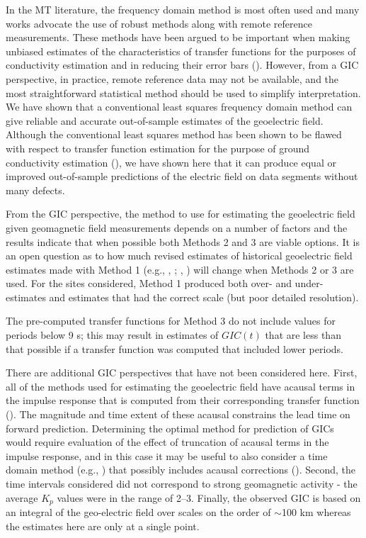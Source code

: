 \documentclass[linenumbers,draft]{agujournal}
\newcommand{\citeay}[1]{%
\citeauthor{#1}, \citeyear{#1}%
}
\begin{document}
In the MT literature, the frequency domain method is most often used and many works advocate the use of robust methods along with remote reference measurements.  These methods have been argued to be important when making unbiased estimates of the characteristics of transfer functions for the purposes of conductivity estimation and in reducing their error bars (\cite{Chave2012}).  However, from a GIC perspective, in practice, remote reference data may not be available, and the most straightforward statistical method should be used to simplify interpretation.  We have shown that a conventional least squares frequency domain method can give reliable and accurate out-of-sample estimates of the geoelectric field.  Although the conventional least squares method has been shown to be flawed with respect to transfer function estimation for the purpose of ground conductivity estimation (\cite{Egbert1986}), we have shown here that it can produce equal or improved out-of-sample predictions of the electric field on data segments without many defects.   


From the GIC perspective, the method to use for estimating the geoelectric field given geomagnetic field measurements depends on a number of factors and the results indicate that when possible both Methods 2 and 3 are viable options.  It is an open question as to how much revised estimates of historical geoelectric field estimates made with Method 1 (e.g., \citeay{Pulkkinen2012}; \citeay{Wei2013}) will change when Methods 2 or 3 are used.  For the sites considered, Method 1 produced both over- and under-estimates and estimates that had the correct scale (but poor detailed resolution).

The pre-computed transfer functions for Method 3 do not include values for periods below 9 s; this may result in estimates of $GIC(t)$ that are less than that possible if a transfer function was computed that included lower periods. 

There are additional GIC perspectives that have not been considered here.  First, all of the methods used for estimating the geoelectric field have acausal terms in the impulse response that is computed from their corresponding transfer function (\cite{Egbert1992}).  The magnitude and time extent of these acausal constrains the lead time on forward prediction.  Determining the optimal method for prediction of GICs would require evaluation of the effect of truncation of acausal terms in the impulse response, and in this case it may be useful to also consider a time domain method (e.g., \cite{McMechan1985}) that possibly includes acausal corrections (\cite{Tzschoppe2009}).  Second, the time intervals considered did not correspond to strong geomagnetic activity - the average $K_p$ values were in the range of 2--3.  Finally, the observed GIC is based on an integral of the geo-electric field over scales on the order of $\sim$100 km whereas the estimates here are only at a single point.
\end{document}
